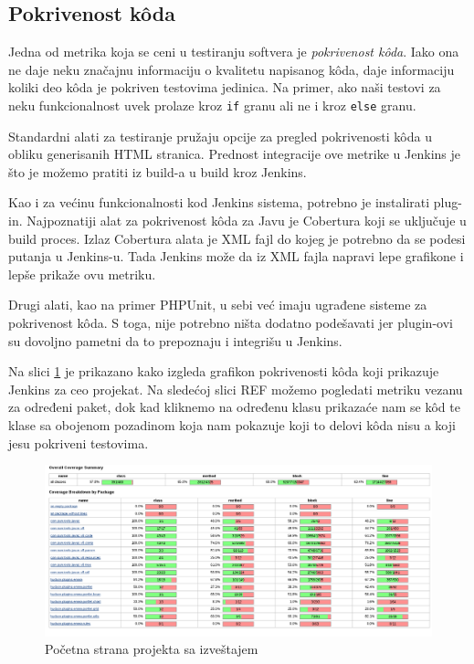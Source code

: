 \subsection{Pokrivenost k\^oda}
Jedna od metrika koja se ceni u testiranju softvera je \textit{pokrivenost k\^oda}. Iako ona ne daje neku značajnu informaciju o kvalitetu napisanog k\^oda, daje informaciju koliki deo k\^oda je pokriven testovima jedinica. Na primer, ako naši testovi za neku funkcionalnost uvek prolaze kroz \verb|if| granu ali ne i kroz \verb|else| granu.

Standardni alati za testiranje pružaju opcije za pregled pokrivenosti k\^oda u obliku generisanih HTML stranica. Prednost integracije ove metrike u Jenkins je što je možemo pratiti iz build-a u build kroz Jenkins. 

Kao i za većinu funkcionalnosti kod Jenkins sistema, potrebno je instalirati plug-in. Najpoznatiji alat za pokrivenost k\^oda za Javu je Cobertura koji se uključuje u build proces. Izlaz Cobertura alata je XML fajl do kojeg je potrebno da se podesi putanja u Jenkins-u. Tada Jenkins može da iz XML fajla napravi lepe grafikone i lepše prikaže ovu metriku.

Drugi alati, kao na primer PHPUnit, u sebi već imaju ugrađene sisteme za pokrivenost k\^oda. S toga, nije potrebno ništa dodatno podešavati jer plugin-ovi su dovoljno pametni da to prepoznaju i integrišu u Jenkins.

Na slici \ref{fig:test_project_coverage} je prikazano kako izgleda grafikon pokrivenosti k\^oda koji prikazuje Jenkins za ceo projekat. Na sledećoj slici REF možemo pogledati metriku vezanu za određeni paket, dok kad kliknemo na određenu klasu prikazaće nam se k\^od te klase sa obojenom pozadinom koja nam pokazuje koji to delovi k\^oda nisu a koji jesu pokriveni testovima.

\begin{figure}
\begin{center}
\includegraphics[scale=0.25]{slike/test_project_coverage.png}
\end{center}
\caption{Početna strana projekta sa izveštajem}
\label{fig:test_project_coverage}
\end{figure}




